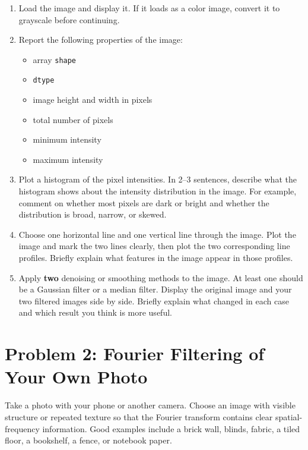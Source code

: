 \documentclass[11pt]{article}
\begin{document}
\begin{enumerate}[label=\alph*)]
  \item Load the image and display it. If it loads as a color image, convert it to grayscale before continuing.

  \item Report the following properties of the image:
  \begin{itemize}
    \item array \texttt{shape}
    \item \texttt{dtype}
    \item image height and width in pixels
    \item total number of pixels
    \item minimum intensity
    \item maximum intensity
  \end{itemize}

  \item Plot a histogram of the pixel intensities. In 2--3 sentences, describe what the histogram shows about the intensity distribution in the image. For example, comment on whether most pixels are dark or bright and whether the distribution is broad, narrow, or skewed.

  \item Choose one horizontal line and one vertical line through the image. Plot the image and mark the two lines clearly, then plot the two corresponding line profiles. Briefly explain what features in the image appear in those profiles.

  \item Apply \textbf{two} denoising or smoothing methods to the image. At least one should be a Gaussian filter or a median filter. Display the original image and your two filtered images side by side. Briefly explain what changed in each case and which result you think is more useful.
\end{enumerate}

\section*{Problem 2: Fourier Filtering of Your Own Photo}

Take a photo with your phone or another camera. Choose an image with visible structure or repeated texture so that the Fourier transform contains clear spatial-frequency information. Good examples include a brick wall, blinds, fabric, a tiled floor, a bookshelf, a fence, or notebook paper.
\end{document}
